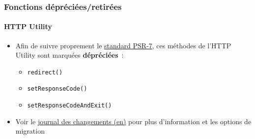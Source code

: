%

\begin{frame}[fragile]
	\frametitle{Fonctions dépréciées/retirées}
	\framesubtitle{HTTP Utility}

	\begin{itemize}
		\item Afin de suivre proprement le \href{https://www.php-fig.org/psr/psr-7/}{standard PSR-7},
			ces méthodes de l'HTTP Utility sont marquées \textbf{dépréciées}~:

			\begin{itemize}
				\item \texttt{redirect()}
				\item \texttt{setResponseCode()}
				\item \texttt{setResponseCodeAndExit()}
			\end{itemize}

		\item Voir le
			\href{https://docs.typo3.org/c/typo3/cms-core/master/en-us/Changelog/11.3/Deprecation-94316-DeprecatedHTTPHeaderManipulatingMethodsFromHttpUtility.html}{journal des changements (en)}
			pour plus d'information et les options de migration

	\end{itemize}

\end{frame}

